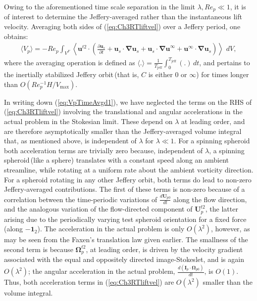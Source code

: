 \documentclass{jfm}
\begin{document}
Owing to the aforementioned time scale separation in the limit $\lambda, Re_p \ll 1$, it is of interest to determine the Jeffery-averaged rather than the instantaneous lift velocity. Averaging both sides of (\ref{eq:Ch3RTliftvel}) over a Jeffery period, one obtains:
\begin{align}
\langle V_p\rangle=-Re_p\int_{V^F}\left\langle\bm{u}^{t2}\cdot\left(\frac{\partial\bm{u}_s}{\partial t}+\bm{u}_s\cdot\bm{\nabla u}_s+\bm{u}_s\cdot\bm{\nabla u}^\infty+\bm{u}^\infty\cdot\bm{\nabla}\bm{u}_s\right)\right\rangle\,\, dV,
\label{eq:VpTimeAvgd1}
\end{align}
where the averaging operation is defined as $\langle.\rangle = \frac{1}{T_\text{jeff}}\int_0^{T_\text{jeff}} (.)\,dt$, and pertains to the inertially stabilized Jeffery orbit\,(that is, $C$ is either $0$ or $\infty$) for times longer than $O(Re_p^{-1}H/V_\text{max})$. 

 In writing down (\ref{eq:VpTimeAvgd1}), we have neglected the terms on the RHS of (\ref{eq:Ch3RTliftvel}) involving the translational and angular accelerations in the actual problem in the Stokesian limit. These depend on $\lambda$ at leading order, and are therefore asymptotically smaller than the Jeffery-averaged volume integral that, as mentioned above, is independent of $\lambda$ for $\lambda \ll 1$. For a spinning spheroid both acceleration terms are trivially zero because, independent of $\lambda$, a spinning spheroid\,(like a sphere) translates with a constant speed along an ambient streamline, while rotating at a uniform rate about the ambient vorticity direction. For a spheroid rotating in any other Jeffery orbit, both terms do lead to non-zero Jeffery-averaged contributions. The first of these terms is non-zero because of a correlation between the time-periodic variations of $\frac{d\bm{U}_{p0}}{dt}$ along the flow direction, and the analogous variation of the flow-directed component of $\bm{U}_p^{t2}$, the latter arising due to the periodically varying test spheroid orientation for a fixed force\,(along $-\bm{1}_2$). The acceleration in the actual problem is only $O(\lambda^2)$, however, as may be seen from the Faxen's translation law given earlier. The smallness of the second term is because $\bm{\Omega}_p^{t2}$, at leading order, is driven by the velocity gradient associated with the equal and oppositely directed image-Stokeslet, and is again $O(\lambda^2)$; the angular acceleration in the actual problem, $\frac{d(\bm{I}_p\cdot\bm{\Omega}_{p0})}{dt}$, is $O(1)$. Thus, both acceleration terms in (\ref{eq:Ch3RTliftvel}) are $O(\lambda^2)$ smaller than the volume integral.
 
\end{document}

